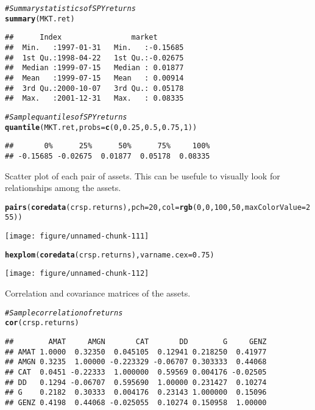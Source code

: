 \documentclass[a4paper]{article}\usepackage[]{graphicx}\usepackage[]{color}
\makeatletter
\def\maxwidth{ %
  \ifdim\Gin@nat@width>\linewidth
    \linewidth
  \else
    \Gin@nat@width
  \fi
}
\newcommand{\hlcom}[1]{\textcolor[rgb]{0.678,0.584,0.686}{\textit{#1}}}%
\newcommand{\hlkwd}[1]{\textcolor[rgb]{0.737,0.353,0.396}{\textbf{#1}}}%
\newenvironment{kframe}{%
 \def\at@end@of@kframe{}%
 \ifinner\ifhmode%
  \def\at@end@of@kframe{\end{minipage}}%
  \begin{minipage}{\columnwidth}%
 \fi\fi%
 \def\FrameCommand##1{\hskip\@totalleftmargin \hskip-\fboxsep
 \colorbox{shadecolor}{##1}\hskip-\fboxsep
     \hskip-\linewidth \hskip-\@totalleftmargin \hskip\columnwidth}%
 \MakeFramed {\advance\hsize-\width
   \@totalleftmargin\z@ \linewidth\hsize
   \@setminipage}}%
 {\par\unskip\endMakeFramed%
 \at@end@of@kframe}
\newenvironment{knitrout}{}{} %
\makeatother
\begin{document}
\begin{knitrout}
\begin{kframe}
\begin{alltt}
\hlcom{# Summary statistics of SPY returns}
\hlkwd{summary}(MKT.ret)
\end{alltt}
\begin{verbatim}
##      Index                market        
##  Min.   :1997-01-31   Min.   :-0.15685  
##  1st Qu.:1998-04-22   1st Qu.:-0.02675  
##  Median :1999-07-15   Median : 0.01877  
##  Mean   :1999-07-15   Mean   : 0.00914  
##  3rd Qu.:2000-10-07   3rd Qu.: 0.05178  
##  Max.   :2001-12-31   Max.   : 0.08335
\end{verbatim}
\begin{alltt}

\hlcom{# Sample quantiles of SPY returns}
\hlkwd{quantile}(MKT.ret, probs = \hlkwd{c}(0, 0.25, 0.5, 0.75, 1))
\end{alltt}
\begin{verbatim}
##       0%      25%      50%      75%     100% 
## -0.15685 -0.02675  0.01877  0.05178  0.08335
\end{verbatim}
\end{kframe}
\end{knitrout}


Scatter plot of each pair of assets. This can be usefule to visually look for relationships among the assets.
\begin{knitrout}
\color{fgcolor}\begin{kframe}
\begin{alltt}
\hlkwd{pairs}(\hlkwd{coredata}(crsp.returns), pch=20, col=\hlkwd{rgb}(0,0,100,50,maxColorValue=255))
\end{alltt}
\end{kframe}
\texttt{[image: figure/unnamed-chunk-111]} 
\begin{kframe}\begin{alltt}
\hlkwd{hexplom}(\hlkwd{coredata}(crsp.returns), varname.cex=0.75)
\end{alltt}
\end{kframe}
\texttt{[image: figure/unnamed-chunk-112]} 

\end{knitrout}


Correlation and covariance matrices of the assets.
\begin{knitrout}
\color{fgcolor}\begin{kframe}
\begin{alltt}
\hlcom{# Sample correlation of returns}
\hlkwd{cor}(crsp.returns)
\end{alltt}
\begin{verbatim}
##        AMAT     AMGN       CAT       DD        G     GENZ
## AMAT 1.0000  0.32350  0.045105  0.12941 0.218250  0.41977
## AMGN 0.3235  1.00000 -0.223329 -0.06707 0.303333  0.44068
## CAT  0.0451 -0.22333  1.000000  0.59569 0.004176 -0.02505
## DD   0.1294 -0.06707  0.595690  1.00000 0.231427  0.10274
## G    0.2182  0.30333  0.004176  0.23143 1.000000  0.15096
## GENZ 0.4198  0.44068 -0.025055  0.10274 0.150958  1.00000
\end{verbatim}
\end{kframe}
\end{knitrout}
\end{document}
